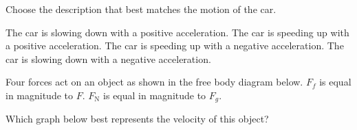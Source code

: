 \documentclass[]{exam}
\begin{document}
\begin{questions}
\begin{center}
\end{center}

Choose the description that best matches the motion of the car.

\begin{randomizechoices}
    \choice The car is slowing down with a positive acceleration.
    \choice The car is speeding up with a positive acceleration.
    \choice The car is speeding up with a negative acceleration.
    \correctchoice The car is slowing down with a negative acceleration.
\end{randomizechoices}

\question
Four forces act on an object as shown in the free body diagram below. $F_f$ is equal in magnitude to $F$. $F_\mathrm{N}$ is equal in magnitude to $F_g$.

\begin{center}
\end{center}

Which graph below best represents the velocity of this object?


\end{questions}
\end{document}
